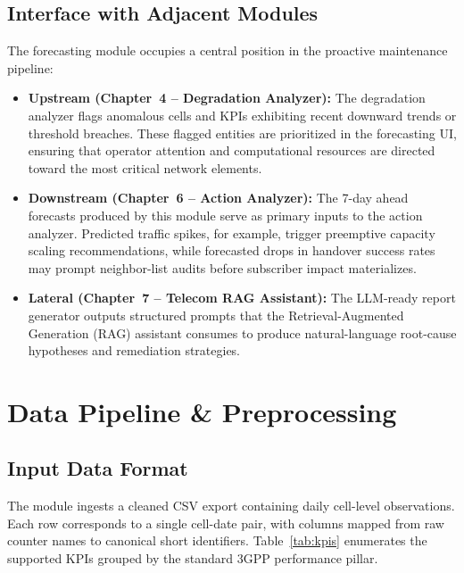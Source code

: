 \subsection{Interface with Adjacent Modules}

The forecasting module occupies a central position in the proactive maintenance pipeline:

\begin{itemize}
    \item \textbf{Upstream (Chapter~4 -- Degradation Analyzer):} The degradation analyzer flags anomalous cells and KPIs exhibiting recent downward trends or threshold breaches. These flagged entities are prioritized in the forecasting UI, ensuring that operator attention and computational resources are directed toward the most critical network elements.

    \item \textbf{Downstream (Chapter~6 -- Action Analyzer):} The 7-day ahead forecasts produced by this module serve as primary inputs to the action analyzer. Predicted traffic spikes, for example, trigger preemptive capacity scaling recommendations, while forecasted drops in handover success rates may prompt neighbor-list audits before subscriber impact materializes.

    \item \textbf{Lateral (Chapter~7 -- Telecom RAG Assistant):} The LLM-ready report generator outputs structured prompts that the Retrieval-Augmented Generation (RAG) assistant consumes to produce natural-language root-cause hypotheses and remediation strategies.
\end{itemize}


\section{Data Pipeline \& Preprocessing}
\label{sec:forecasting_data}

\subsection{Input Data Format}

The module ingests a cleaned CSV export containing daily cell-level observations. Each row corresponds to a single cell-date pair, with columns mapped from raw counter names to canonical short identifiers. Table~\ref{tab:kpis} enumerates the supported KPIs grouped by the standard 3GPP performance pillar.

